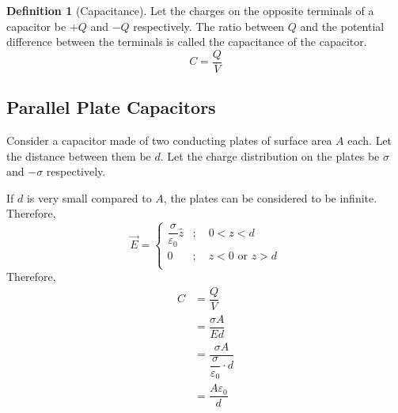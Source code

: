 \documentclass[fleqn, a4paper, 12pt, twoside]{article}
\theoremstyle{definition}
\newtheorem{definition}{Definition}
\theoremstyle{theorem}
\begin{document}
\begin{definition}[Capacitance]
	Let the charges on the opposite terminals of a capacitor be $+Q$ and $-Q$ respectively.
	The ratio between $Q$ and the potential difference between the terminals is called the capacitance of the capacitor.
	\begin{equation*}
		C = \dfrac{Q}{V}
	\end{equation*}
\end{definition}

\subsection{Parallel Plate Capacitors}

Consider a capacitor made of two conducting plates of surface area $A$ each.
Let the distance between them be $d$.
Let the charge distribution on the plates be $\sigma$ and $-\sigma$ respectively.\\
\begin{figure}[H]
\end{figure}
If $d$ is very small compared to $A$, the plates can be considered to be infinite.\\
Therefore,
\begin{equation*}
	\overrightarrow{E} = 
		\begin{cases}
			\dfrac{\sigma}{\varepsilon_0} \hat{z} &;\quad 0 < z < d\\
			0                                     &;\quad z < 0 \text{ or } z > d\\
		\end{cases}
\end{equation*}
Therefore,
\begin{align*}
	C &= \dfrac{Q}{V}\\
	  &= \dfrac{\sigma A}{E d}\\
	  &= \dfrac{\sigma A}{\dfrac{\sigma}{\varepsilon_0} \cdot d}\\
	  &= \dfrac{A \varepsilon_0}{d}
\end{align*}
\end{document}
